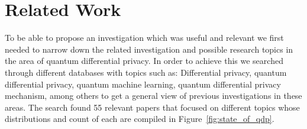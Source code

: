 \documentclass{ieeeaccess}
\begin{document}
\section{Related Work}
\label{sec:related_work}
To be able to propose an investigation which was useful and relevant we first needed to narrow down the related investigation and possible research topics in the area of quantum differential privacy. In order to achieve this we searched through different databases with topics such as: Differential privacy, quantum differential privacy, quantum machine learning, quantum differential privacy mechanism, among others to get a general view of previous investigations in these areas. The search found 55 relevant papers that focused on different topics whose distributions and count of each are compiled in Figure~\ref{fig:state_of_qdp}.
\end{document}
